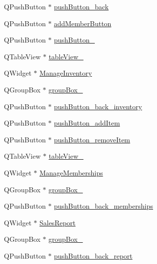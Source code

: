 \begin{DoxyCompactItemize}
\item 
Q\+Push\+Button $\ast$ \hyperlink{class_ui___main_window_a111f7e700db9586e4cd1448036c2513e}{push\+Button\+\_\+back}
\item 
Q\+Push\+Button $\ast$ \hyperlink{class_ui___main_window_aaf47d07d01c23206b9f05e2fca40d475}{add\+Member\+Button}
\item 
Q\+Push\+Button $\ast$ \hyperlink{class_ui___main_window_acb0b2f196dc2224f287b67594233297f}{push\+Button\+\_}
\item 
Q\+Table\+View $\ast$ \hyperlink{class_ui___main_window_aa74bf9fcf75456d6b6278c8b82c26a35}{table\+View\+\_}
\item 
Q\+Widget $\ast$ \hyperlink{class_ui___main_window_a7a89ffa58ff1cfe442f4c636ed8821a3}{Manage\+Inventory}
\item 
Q\+Group\+Box $\ast$ \hyperlink{class_ui___main_window_af87dc4910dc4b3434047edbb31527969}{group\+Box\+\_}
\item 
Q\+Push\+Button $\ast$ \hyperlink{class_ui___main_window_a98840a5510aeed6ba210d23556d31c05}{push\+Button\+\_\+back\+\_\+inventory}
\item 
Q\+Push\+Button $\ast$ \hyperlink{class_ui___main_window_adc94edf92cfe4151d11fa58e1685c4b1}{push\+Button\+\_\+add\+Item}
\item 
Q\+Push\+Button $\ast$ \hyperlink{class_ui___main_window_a756e18ea723bf8a5ad09662ae8f1f95e}{push\+Button\+\_\+remove\+Item}
\item 
Q\+Table\+View $\ast$ \hyperlink{class_ui___main_window_a20838d0702e566bb51b95ab8b8abd9ca}{table\+View\+\_}
\item 
Q\+Widget $\ast$ \hyperlink{class_ui___main_window_a1059ae9207dac9a1d8e2367a4f1f18be}{Manage\+Memberships}
\item 
Q\+Group\+Box $\ast$ \hyperlink{class_ui___main_window_a40a9931365fd3679efec4f0112073db2}{group\+Box\+\_}
\item 
Q\+Push\+Button $\ast$ \hyperlink{class_ui___main_window_ae541264c49252cff9c55c1d4a1c64682}{push\+Button\+\_\+back\+\_\+memberships}
\item 
Q\+Widget $\ast$ \hyperlink{class_ui___main_window_a668aea70efad10387c8316df8e836a5b}{Sales\+Report}
\item 
Q\+Group\+Box $\ast$ \hyperlink{class_ui___main_window_a269faaef68e4ad4784635810fcae5698}{group\+Box\+\_}
\item 
Q\+Push\+Button $\ast$ \hyperlink{class_ui___main_window_a0efd41c53734ce1eec853a7ef03f8545}{push\+Button\+\_\+back\+\_\+report}
\item 

\end{DoxyCompactItemize}
